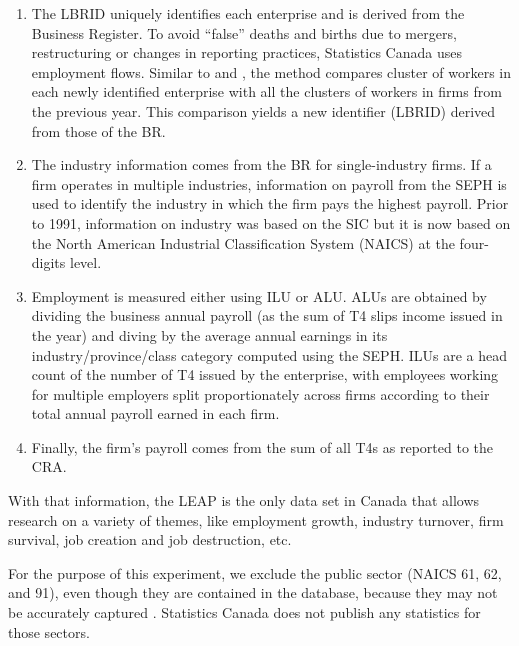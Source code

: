 \begin{enumerate}

\item The LBRID uniquely identifies each enterprise and is derived from the Business Register. To avoid ``false'' deaths and births due to mergers, restructuring or changes in reporting practices, Statistics Canada uses employment flows. Similar to \citet{BenedettoEtAl2007} and \citet{RePEc:iab:iabfme:201006_en}, the method  compares cluster of workers in each newly identified enterprise with all the clusters of workers in firms from the previous year. This comparison yields a new identifier (LBRID) derived from those of the \ac{BR}.

\item The industry information comes from the \ac{BR} for single-industry firms. If a firm operates in multiple industries, information on payroll from the \ac{SEPH} is used to identify the industry in which the firm pays the highest payroll. Prior to 1991, information on industry was based on the SIC but it is now based on the  North American Industrial Classification System (NAICS) at the four-digits level. 

\item Employment is measured either using \ac{ILU} or \ac{ALU}. \acp{ALU} are obtained by dividing the business annual payroll (as the sum of T4 slips income issued in the year) and diving by the average annual earnings in its industry/province/class category computed using the \ac{SEPH}. \acp{ILU} are a head count of the number of T4 issued by the enterprise, with employees working for multiple employers split proportionately across firms according to their total annual payroll earned in each firm. 

\item Finally, the firm's payroll comes from the sum of all T4s as reported to the CRA.

\end{enumerate}
With that information, the \ac{LEAP} is the only data set in Canada  that allows research on a variety of themes, like employment growth, industry turnover, firm survival, job creation and job destruction, etc. 

For the purpose of this experiment,  we exclude the public sector (NAICS 61, 62, and 91), even though they are contained in the database, because they may not be accurately captured \citep{StatisticsCanada2019}. Statistics Canada does not publish any statistics for those sectors.